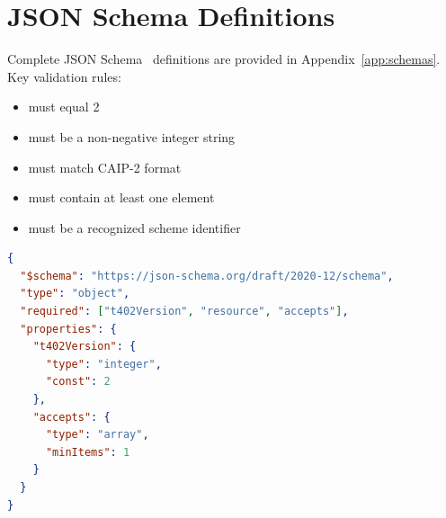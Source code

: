 \section{JSON Schema Definitions}
\label{sec:json-schemas}

Complete JSON Schema~\cite{jsonschema} definitions are provided in Appendix~\ref{app:schemas}. Key validation rules:

\begin{itemize}
    \item {} must equal 2
    \item {} must be a non-negative integer string
    \item {} must match CAIP-2 format
    \item {} must contain at least one element
    \item {} must be a recognized scheme identifier
\end{itemize}

\begin{lstlisting}[language=json,caption={Example validation with JSON Schema}]
{
  "$schema": "https://json-schema.org/draft/2020-12/schema",
  "type": "object",
  "required": ["t402Version", "resource", "accepts"],
  "properties": {
    "t402Version": {
      "type": "integer",
      "const": 2
    },
    "accepts": {
      "type": "array",
      "minItems": 1
    }
  }
}
\end{lstlisting}
